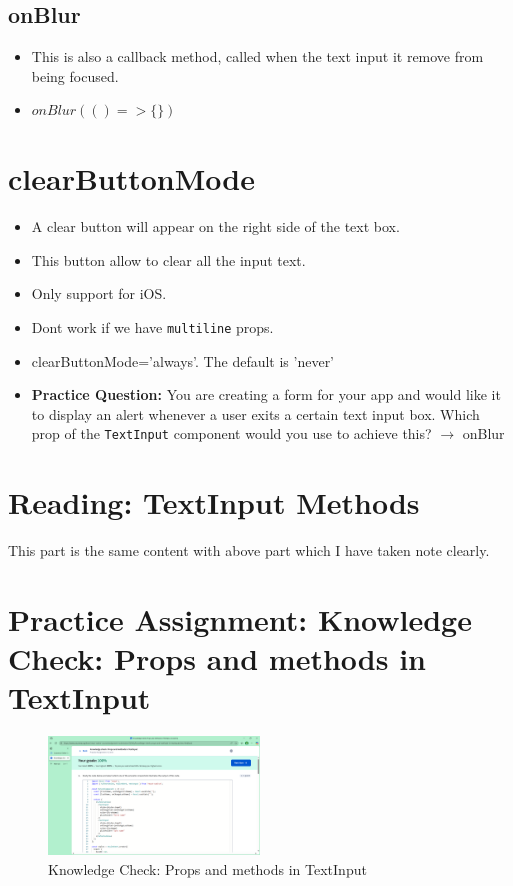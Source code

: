 \subsection{onBlur}
\begin{itemize}
    \item This is also a callback method, called when the text input it remove from being focused.
    \item $onBlur(() => \{ \})$
\end{itemize}

\section{clearButtonMode}
\begin{itemize}
    \item A clear button will appear on the right side of the text box.
    \item This button allow to clear all the input text.
    \item Only support for iOS.
    \item Dont work if we have \texttt{multiline} props.
    \item clearButtonMode='always'. The default is 'never'
    \item \textbf{Practice Question:} You are creating a form for your app and would like it to display an alert whenever a user exits a certain text input box. Which prop of the \texttt{TextInput} component would you use to achieve this? 
    $\rightarrow$ onBlur
\end{itemize}

\section{Reading: TextInput Methods}
This part is the same content with above part which I have taken note clearly.

\section{Practice Assignment: Knowledge Check: Props and methods in TextInput}
\begin{figure}[H]
    \centering
    \includegraphics[width=0.5\textwidth]{images/kc-4.png}
    \caption{Knowledge Check: Props and methods in TextInput}
\end{figure}

